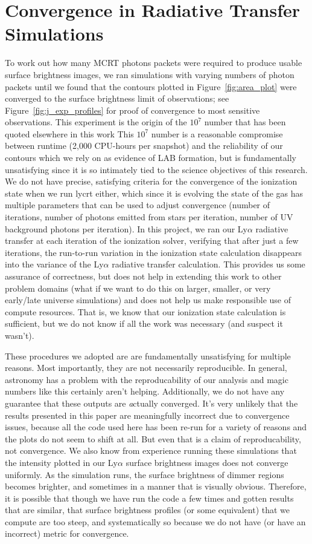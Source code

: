 \section{Convergence in Radiative Transfer Simulations}
To work out how many MCRT photons packets were required to produce usable surface brightness images, we ran simulations with varying numbers of photon packets until we found that the contours plotted in Figure~\ref{fig:area_plot} were converged to the surface brightness limit of observations; see Figure~\ref{fig:j_exp_profiles} for proof of convergence to most sensitive observations.
This experiment is the origin of the $10^7$ number that has been quoted elsewhere in this work
This $10^7$ number is a reasonable compromise between runtime (2,000 CPU-hours per snapshot) and the reliability of our contours which we rely on as evidence of LAB formation, but is fundamentally unsatisfying since it is so intimately tied to the science objectives of this research.
We do not have precise, satisfying criteria for the convergence of the ionization state when we run {\sc lycrt} either, which since it is evolving the state of the gas has multiple parameters that can be used to adjust convergence (number of iterations, number of photons emitted from stars per iteration, number of UV background photons per iteration).
In this project, we ran our Ly$\alpha$ radiative transfer at each iteration of the ionization solver, verifying that after just a few iterations, the run-to-run variation in the ionization state calculation disappears into the variance of the Ly$\alpha$ radiative transfer calculation.
This provides us some assurance of correctness, but does not help in extending this work to other problem domains (what if we want to do this on larger, smaller, or very early/late universe simulations) and does not help us make responsible use of compute resources.
That is, we know that our ionization state calculation is sufficient, but we do not know if all the work was necessary (and suspect it wasn't).

These procedures we adopted are are fundamentally unsatisfying for multiple reasons.
Most importantly, they are not necessarily reproducible.
In general, astronomy has a problem with the reproducability of our analysis and magic numbers like this certainly aren't helping.
Additionally, we do not have any guarantee that these outputs are {\emph actually} converged.
It's very unlikely that the results presented in this paper are meaningfully incorrect due to convergence issues, because all the code used here has been re-run for a variety of reasons and the plots do not seem to shift at all.
But even that is a claim of reproducability, not convergence.
We also know from experience running these simulations that the intensity plotted in our Ly$\alpha$ surface brightness images does not converge uniformly.
As the simulation runs, the surface brightness of dimmer regions becomes brighter, and sometimes in a manner that is visually obvious.
Therefore, it is possible that though we have run the code a few times and gotten results that are similar, that surface brightness profiles (or some equivalent) that we compute are too steep, and systematically so because we do not have (or have an incorrect) metric for convergence.

